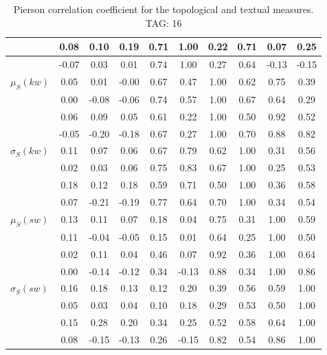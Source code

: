\begin{table*}[h!]
\begin{center}
\begin{tabular}{| l | c | c | c | c | c | c | c | c | c |}
 & 0.08  & 0.10  & 0.19  & 0.71  & 1.00  & 0.22  & 0.71  & 0.07  & 0.25 \\\hline
 & -0.07  & 0.03  & 0.01  & 0.74  & 1.00  & 0.27  & 0.64  & -0.13  & -0.15 \\\hline
$\mu_S(kw)$ & 0.05  & 0.01  & -0.00  & 0.67  & 0.47  & 1.00  & 0.62  & 0.75  & 0.39 \\\hline
 & 0.00  & -0.08  & -0.06  & 0.74  & 0.57  & 1.00  & 0.67  & 0.64  & 0.29 \\\hline
 & 0.06  & 0.09  & 0.05  & 0.61  & 0.22  & 1.00  & 0.50  & 0.92  & 0.52 \\\hline
 & -0.05  & -0.20  & -0.18  & 0.67  & 0.27  & 1.00  & 0.70  & 0.88  & 0.82 \\\hline
$\sigma_S(kw)$ & 0.11  & 0.07  & 0.06  & 0.67  & 0.79  & 0.62  & 1.00  & 0.31  & 0.56 \\\hline
 & 0.02  & 0.03  & 0.06  & 0.75  & 0.83  & 0.67  & 1.00  & 0.25  & 0.53 \\\hline
 & 0.18  & 0.12  & 0.18  & 0.59  & 0.71  & 0.50  & 1.00  & 0.36  & 0.58 \\\hline
 & 0.07  & -0.21  & -0.19  & 0.77  & 0.64  & 0.70  & 1.00  & 0.34  & 0.54 \\\hline
$\mu_S(sw)$ & 0.13  & 0.11  & 0.07  & 0.18  & 0.04  & 0.75  & 0.31  & 1.00  & 0.59 \\\hline
 & 0.11  & -0.04  & -0.05  & 0.15  & 0.01  & 0.64  & 0.25  & 1.00  & 0.50 \\\hline
 & 0.02  & 0.11  & 0.04  & 0.46  & 0.07  & 0.92  & 0.36  & 1.00  & 0.64 \\\hline
 & 0.00  & -0.14  & -0.12  & 0.34  & -0.13  & 0.88  & 0.34  & 1.00  & 0.86 \\\hline
$\sigma_S(sw)$ & 0.16  & 0.18  & 0.13  & 0.12  & 0.20  & 0.39  & 0.56  & 0.59  & 1.00 \\\hline
 & 0.05  & 0.03  & 0.04  & 0.10  & 0.18  & 0.29  & 0.53  & 0.50  & 1.00 \\\hline
 & 0.15  & 0.28  & 0.20  & 0.34  & 0.25  & 0.52  & 0.58  & 0.64  & 1.00 \\\hline
 & 0.08  & -0.15  & -0.13  & 0.26  & -0.15  & 0.82  & 0.54  & 0.86  & 1.00 \\\hline
\end{tabular}
\caption{Pierson correlation coefficient for the topological and textual measures. TAG: 16}
\end{center}
\end{table*}